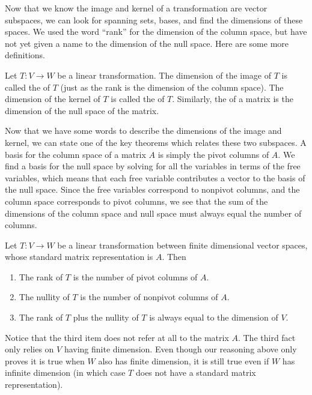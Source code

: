 Now that we know the image and kernel of a transformation are vector subspaces, we can look for spanning sets, bases, and find the dimensions of these spaces. We used the word ``rank'' for the dimension of the column space, but have not yet given a name to the dimension of the null space.  Here are some more definitions.

\begin{definition} 
Let $T\colon V\to W$ be a linear transformation. 
The dimension of the image of $T$ is called the  of $T$ (just as the rank is the dimension of the column space).
The dimension of the kernel of $T$ is called the  of $T$.  Similarly, the  of a matrix is the dimension of the null space of the matrix.
\end{definition}

Now that we have some words to describe the dimensions of the image and kernel, we can state one of the key theorems which relates these two subspaces.  A basis for the column space of a matrix $A$ is simply the pivot columns of $A$. We find a basis for the null space by solving for all the variables in terms of the free variables, which means that each free variable contributes a vector to the basis of the null space.  Since the free variables correspond to nonpivot columns, and the column space corresponds to pivot columns, we see that the sum of the dimensions of the column space and null space must always equal the number of columns.  

\begin{theorem}
Let $T\colon V\to W$ be a linear transformation between finite dimensional vector spaces, whose standard matrix representation is $A$.  Then 
\begin{enumerate}
	\item The rank of $T$ is the number of pivot columns of $A$. 
	\item The nullity of $T$ is the number of nonpivot columns of $A$. 
	\item The rank of $T$ plus the nullity of $T$ is always equal to the dimension of $V$. 
\end{enumerate}
\end{theorem}
Notice that the third item does not refer at all to the matrix $A$.  The third fact only relies on $V$ having finite dimension.  Even though our reasoning above only proves it is true when $W$ also has finite dimension, it is still true even if $W$ has infinite dimension (in which case $T$ does not have a standard matrix representation). 


